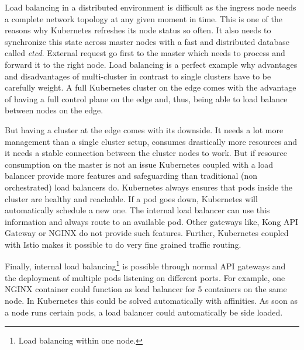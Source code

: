 Load balancing in a distributed environment is difficult as the ingress node needs a complete network topology at any given moment in time. This is one of the reasons why Kubernetes refreshes its node status so often. It also needs to synchronize this state across master nodes with a fast and distributed database called \textit{etcd}. External request go first to the master which needs to process and forward it to the right node. Load balancing is a perfect example why advantages and disadvantages of multi-cluster in contrast to single clusters have to be carefully weight. A full Kubernetes cluster on the edge comes with the advantage of having a full control plane on the edge and, thus, being able to load balance between nodes on the edge. 

But having a cluster at the edge comes with its downside. It needs a lot more management than a single cluster setup, consumes drastically more resources  and it needs a stable connection between the cluster nodes to work. But if resource consumption on the master is not an issue Kubernetes coupled with a load balancer provide more features and safeguarding than traditional (non orchestrated) load balancers do. Kubernetes always ensures that pods inside the cluster are healthy and reachable. If a pod goes down, Kubernetes will automatically schedule a new one. The internal load balancer can use this information and always route to an available pod. Other gateways like, Kong API Gateway or NGINX do not provide such features. Further, Kubernetes coupled with Istio makes it possible to do very fine grained traffic routing.

Finally, internal load balancing\footnote{Load balancing within one node.} is possible through normal API gateways and the deployment of multiple pods listening on different ports. For example, one NGINX container could function as load balancer for 5 containers on the same node. In Kubernetes this could be solved automatically with affinities. As soon as a node runs certain pods, a load balancer could automatically be side loaded.\\[5mm]